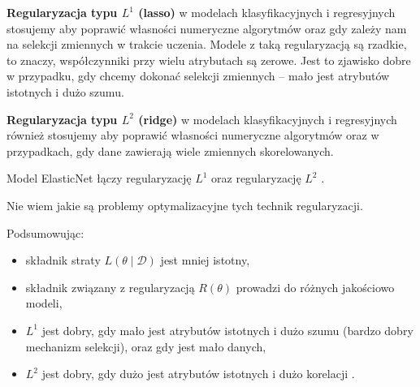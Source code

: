\documentclass[wi]{zut}
\begin{document}
\textbf{Regularyzacja typu $L^1$ (lasso)} w modelach klasyfikacyjnych i regresyjnych stosujemy aby poprawić własności numeryczne algorytmów oraz gdy zależy nam na selekcji zmiennych w trakcie uczenia. Modele z taką regularyzacją są rzadkie, to znaczy, współczynniki przy wielu atrybutach są zerowe. Jest to zjawisko dobre w przypadku, gdy chcemy dokonać selekcji zmiennych -- mało jest atrybutów istotnych i dużo szumu.

\textbf{Regularyzacja typu $L^2$ (ridge)} w modelach klasyfikacyjnych i regresyjnych również stosujemy aby poprawić własności numeryczne algorytmów oraz w przypadkach, gdy dane zawierają wiele zmiennych skorelowanych.

Model ElasticNet łączy regularyzację $L^1$ oraz regularyzację $L^2$ \cite{wiki:Elastic_net_regularization}. 

Nie wiem jakie są problemy optymalizacyjne tych technik regularyzacji.
\question

Podsumowując:

\begin{itemize}
    \item składnik straty $L(\theta \mid \mathscr{D})$ jest mniej istotny,
    \item składnik związany z regularyzacją $R(\theta)$ prowadzi do różnych jakościowo modeli,
    \item $L^1$ jest dobry, gdy mało jest atrybutów istotnych i dużo szumu (bardzo dobry mechanizm selekcji), oraz gdy jest mało danych,
    \item $L^2$ jest dobry, gdy dużo jest atrybutów istotnych i dużo korelacji \cite{Korzen2020_12}.
\end{itemize}

\printbibliography[heading=bibintoc]



\end{document}
